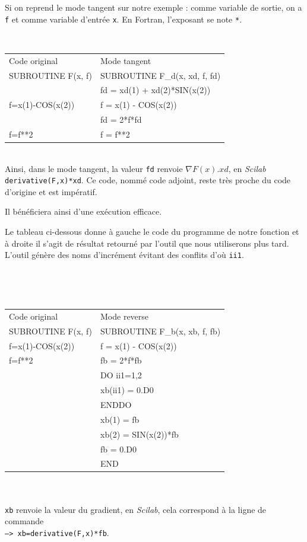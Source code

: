  Si on reprend le mode tangent sur notre exemple : comme variable de sortie, on a {\tt f} et 
comme variable d'entr\'ee {\tt x}. {\co En Fortran, l'exposant se note {\tt **}.} \\


{\tt
\begin{tabular}{|l|l|}
  \hline
  Code original & Mode tangent \\
  SUBROUTINE F(x, f) & SUBROUTINE F\_d(x, xd, f, fd) \\
  \hline
			& fd = xd(1) + xd(2)*SIN(x(2)) \\
    f=x(1)-COS(x(2))	& f = x(1) - COS(x(2))\\
			& fd = 2*f*fd\\
    f=f**2    		& f = f**2\\  
  \hline
\end{tabular}
}\\

Ainsi, dans le mode tangent, la valeur {\tt fd} renvoie $\nabla F(x).xd$, en {\it Scilab} \\ 
{\tt derivative(F,x)*xd}.
Ce code, nomm\'e code adjoint, reste tr\`es proche du code d'origine et est imp\'eratif. {\co Il b\'en\'eficiera ainsi d'une ex\'ecution 
efficace.

Le tableau ci-dessous donne \`a gauche le code du programme de notre fonction et \`a droite il s'agit de r\'esultat retourn\'e par 
l'outil que nous utiliserons plus tard. L'outil g\'en\`ere des noms d'incr\'ement \'evitant des conflits d'o\`u {\tt ii1}.} \\



{\tt
\begin{tabular}{|l|l|}
  \hline
  Code original & Mode reverse \\
  SUBROUTINE F(x, f) & SUBROUTINE F\_b(x, xb, f, fb) \\
  \hline


     f=x(1)-COS(x(2))   &  f = x(1) - COS(x(2)) \\
     f=f**2	          &  fb = 2*f*fb \\
			  &  DO ii1=1,2 \\
			  &    xb(ii1) = 0.D0 \\
			  &  ENDDO \\
			  &  xb(1) = fb \\
			  &  xb(2) = SIN(x(2))*fb \\
			  &  fb = 0.D0 \\
			  &  END \\
  \hline
\end{tabular}
} \\
\vspace{0.5cm}
\\{\tt xb} renvoie la valeur du gradient, en {\it Scilab}, cela correspond \`a la ligne de commande\\ {\tt ---> xb=derivative(F,x)*fb}.




